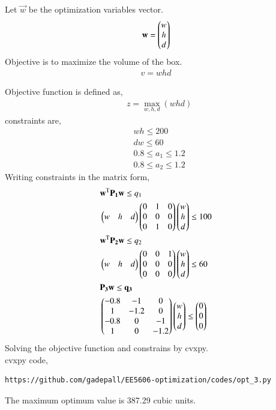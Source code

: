 \documentclass[journal,12pt,twocolumn]{IEEEtran}
\begin{document}
\begin{enumerate}
Let $\vec{w}$ be the optimization variables vector.
\begin{align}
\mathbf{w} = \begin{pmatrix}w\\h\\d\end{pmatrix}
\end{align}
Objective is to maximize the volume of the box. \\
\begin{align}
{v=whd} \nonumber
\end{align}

Objective function is defined as,
\begin{align}
&z= \max_{w,h,d} (whd)
\end{align}
constraints are,
\begin{align}
& {wh\leq 200}\\
&{ dw \leq 60}\\
&{0.8\leq a_1\leq 1.2}\\
&{0.8\leq a_2 \leq 1.2}
\end{align}
Writing constraints in the matrix form, 
\begin{align}
&\mathbf{w}^\text{T}\mathbf{P_1}\mathbf{w} \leq q_1\\
& \begin{pmatrix}w&h&d\end{pmatrix}\begin{pmatrix}0&1&0\\0&0&0\\0&1&0\end{pmatrix}\begin{pmatrix}w\\h\\d\end{pmatrix} \leq 100\\
&\mathbf{w}^\text{T}\mathbf{P_2}\mathbf{w} \leq q_2\\
& \begin{pmatrix}w&h&d\end{pmatrix}\begin{pmatrix}0&0&1\\0&0&0\\0&0&0\end{pmatrix}\begin{pmatrix}w\\h\\d\end{pmatrix} \leq 60\\
&\mathbf{P_3}\mathbf{w}\leq \mathbf{q_3}\\
&\begin{pmatrix}-0.8&-1&0\\1&-1.2&0\\-0.8&0&-1\\1&0&-1.2\end{pmatrix} \begin{pmatrix}w\\h\\d\end{pmatrix} \leq \begin{pmatrix}0\\0\\0\end{pmatrix}
 \end{align}
Solving the objective function and constrains by cvxpy.\\
cvxpy code,
\begin{lstlisting}
https://github.com/gadepall/EE5606-optimization/codes/opt_3.py
\end{lstlisting}
The maximum optimum value is 387.29 cubic units.\\

\end{enumerate}
\end{document}

